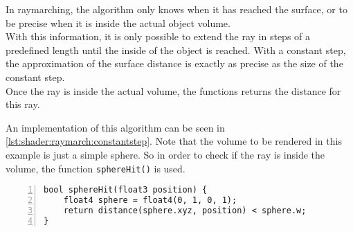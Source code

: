 \pagebreak
\noindent
In \gls{raymarching}, the algorithm only knows when it has reached the surface, or to be precise when it is inside the actual object volume.
\\
With this information, it is only possible to extend the ray in steps of a predefined length until the inside of the object is reached.
With a constant step, the approximation of the surface distance is exactly as precise as the size of the constant step.
\\
Once the ray is inside the actual volume, the functions returns the distance for this ray.

\begin{figure}[H]
    \centering
\end{figure}

\noindent
An implementation of this algorithm can be seen in \autoref{lst:shader:raymarch:constantstep}. Note that the volume to be rendered in this example is just a simple sphere.
So in order to check if the ray is inside the volume, the function \lstinline[language=HLSL]{sphereHit()} is used.
\begin{lstlisting}[language=HLSL, numbers=left, caption=Implementation of a volume distance function for a sphere.,captionpos=b, label=lst:shader:raymarch:spherehit]
bool sphereHit(float3 position) {
    float4 sphere = float4(0, 1, 0, 1);
    return distance(sphere.xyz, position) < sphere.w;
}
\end{lstlisting}

